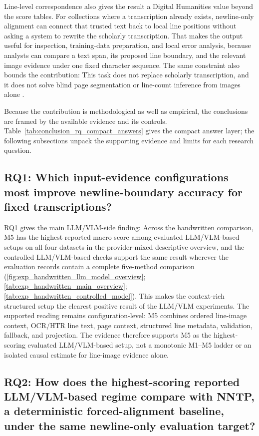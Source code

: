 Line-level correspondence also gives the result a Digital Humanities value beyond the score tables. For collections where a transcription already exists, newline-only alignment can connect that trusted text back to local line positions without asking a system to rewrite the scholarly transcription. That makes the output useful for inspection, training-data preparation, and local error analysis, because analysts can compare a text span, its proposed line boundary, and the relevant image evidence under one fixed character sequence. The same constraint also bounds the contribution: This task does not replace scholarly transcription, and it does not solve blind page segmentation or line-count inference from images alone .

Because the contribution is methodological as well as empirical, the conclusions are framed by the available evidence and its controls. Table~\ref{tab:conclusion_rq_compact_answers} gives the compact answer layer; the following subsections unpack the supporting evidence and limits for each research question.

\subsection{RQ1: Which input-evidence configurations most improve newline-boundary accuracy for fixed transcriptions?}
\label{sec:conclusion_rq1}

RQ1 gives the main LLM/VLM-side finding: Across the handwritten comparison, M5 has the highest reported macro score among evaluated LLM/VLM-based setups on all four datasets in the provider-mixed descriptive overview, and the controlled LLM/VLM-based checks support the same result wherever the evaluation records contain a complete five-method comparison (\autoref{fig:exp_handwritten_llm_model_overview}; \autoref{tab:exp_handwritten_main_overview}; \autoref{tab:exp_handwritten_controlled_model}). This makes the context-rich structured setup the clearest positive result of the LLM/VLM experiments. The supported reading remains configuration-level: M5 combines ordered line-image context, OCR/HTR line text, page context, structured line metadata, validation, fallback, and projection. The evidence therefore supports M5 as the highest-scoring evaluated LLM/VLM-based setup, not a monotonic M1--M5 ladder or an isolated causal estimate for line-image evidence alone.

\subsection{RQ2: How does the highest-scoring reported LLM/VLM-based regime compare with NNTP, a deterministic forced-alignment baseline, under the same newline-only evaluation target?}
\label{sec:conclusion_rq2}

